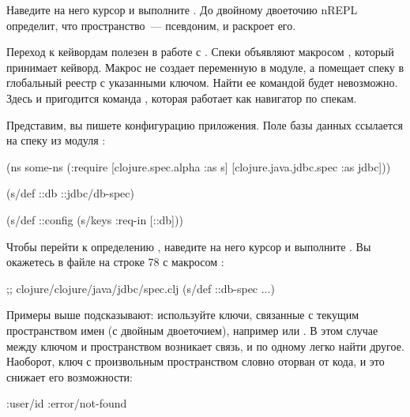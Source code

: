 Наведите на него курсор и выполните . До двойному двоеточию nREPL определит, что пространство~--- псевдоним, и раскроет его.

Переход к кейвордам полезен в работе с . Спеки объявляют макросом , который принимает кейворд. Макрос не создает переменную в модуле, а помещает спеку в глобальный реестр с указанными ключом. Найти ее командой  будет невозможно. Здесь и пригодится команда , которая работает как навигатор по спекам.

Представим, вы пишете конфигурацию приложения. Поле  базы данных ссылается на спеку из модуля :

\begin{english}
  \begin{clojure}
(ns some-ns
  (:require
   [clojure.spec.alpha :as s]
   [clojure.java.jdbc.spec :as jdbc]))

(s/def ::db ::jdbc/db-spec)

(s/def ::config
  (s/keys :req-in [::db]))
  \end{clojure}
\end{english}


Чтобы перейти к определению , наведите на него курсор и выполните . Вы окажетесь в файле  на строке 78 с макросом :

\begin{english}
  \begin{clojure}
;; clojure/clojure/java/jdbc/spec.clj
(s/def ::db-spec ...)
  \end{clojure}
\end{english}

Примеры выше подсказывают: используйте ключи, связанные с текущим пространством имен (с двойным двоеточием), например  или . В этом случае между ключом и пространством возникает связь, и по одному легко найти другое. Наоборот, ключ с произвольным пространством словно оторван от кода, и это снижает его возможности:

\begin{english}
  \begin{clojure}
:user/id
:error/not-found
  \end{clojure}
\end{english}


